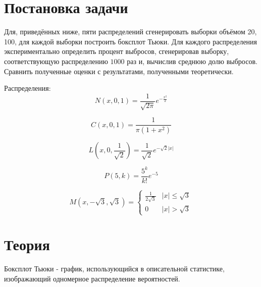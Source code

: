 \documentclass[a4]{article}
\renewcommand{\listoffigures}{\begingroup %
\tocsection
\tocfile{\listfigurename}{lof}
\endgroup}
\renewcommand{\listoftables}{\begingroup %
\tocsection
\tocfile{\listtablename}{lot}
\endgroup}
\begin{document}


\newpage
\tableofcontents{}
\newpage
\listoffigures{}
\listoftables{}
\newpage

\section{Постановка задачи}

Для, приведённых ниже, пяти распределений сгенерировать выборки объёмом 20, 100, для каждой выборки построить боксплот Тьюки. Для каждого распределения экспериментально определить процент выбросов, сгенерировав выборку, соответствующую распределению $1000$ раз и, вычислив среднюю долю выбросов. Сравнить полученные оценки с результатами, полученными теоретически.


Распределения:
\begin{equation}\label{eqn:normal}
N(x,0,1) = \frac{1}{\sqrt{2\pi}}e^{-\frac{x^2}{2}}
\end{equation} 

\begin{equation}\label{eqn:cauchy}
C(x,0,1) = \frac{1}{\pi(1+x^2)}
\end{equation}

\begin{equation}\label{eqn:laplace}
L\left( x,0,\frac{1}{\sqrt{2}}\right) = \frac{1}{\sqrt{2}}e^{-\sqrt{2}\vert x\vert}
\end{equation}

\begin{equation}\label{eqn:poisson}
P(5,k) = \frac{5^k}{k!}e^{-5}
\end{equation}  

\begin{equation}\label{eqn:uniform}
M(x,-\sqrt{3}, \sqrt{3}) = 
\begin{cases}
\frac{1}{2\sqrt{3}} &\vert x\vert \leqslant \sqrt{3}\\
0 &\vert x\vert > \sqrt{3}
\end{cases}
\end{equation}



\section{Теория}

Боксплот Тьюки - график, использующийся в описательной статистике, изображающий одномерное распределение вероятностей.
\end{document}
